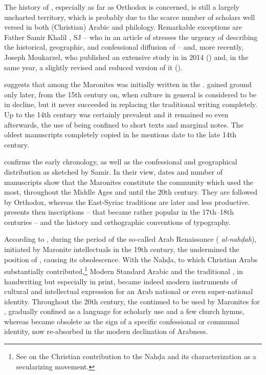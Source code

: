 \documentclass[output=paper,colorlinks,citecolor=brown,arabfont,syriacfont]{langscibook}
\begin{document}
The history of , especially as far as  Orthodox  is concerned, is still a largely uncharted territory, which is probably due to the scarce number of scholars well versed in both (Christian) Arabic and  philology. Remarkable exceptions are Father Samir Khalil \citeauthor{samir1982}, SJ -- who in an article of \citeyear{samir1982} stresses the urgency of describing the historical, geographic, and confessional diffusion of  -- and, more recently, Joseph Moukarzel, who published an extensive study in  in 2014 (\citeyear{moukarzel2014a}) and, in the same year, a slightly revised and reduced  version of it (\citeyear{moukarzel2014b}). 

\citet[43--44]{samir1982} suggests that among the Maronites  was initially written in the  .  gained ground only later, from the 15th century on, when  culture in general is considered to be in decline, but it never succeeded in replacing the traditional  writing completely. Up to the 14th century   was certainly prevalent and it remained so even afterwards, the use of  being confined to short texts and marginal notes. The oldest manuscripts completely copied in  he mentions date to the late 14th century. 


\citet[129--130]{moukarzel2014a} confirms the early chronology, as well as the confessional and geographical distribution as sketched by Samir. In their view, dates and number of manuscripts show that the Maronites constitute the community which used  the most, throughout the Middle Ages and until the 20th century. They are followed by  Orthodox, whereas the East-Syriac  traditions are later and less productive. \citet[130--135]{moukarzel2014a} presents then  inscriptions -- that became rather popular in the 17th--18th centuries -- and the history and orthographic conventions of  typography.


According to \citet{samir1982}, during the period of the so-called Arab Renaissance ( \textit{al-nahḍah}), initiated by Maronite intellectuals in the 19th century, the   undermined the position of , causing its obsolescence. With the Nahḍa, to which Christian Arabs substantially contributed,\footnote{%
See \citet[21]{murre-van_den_berg2020} on the Christian contribution to the Nahḍa and its characterization as a secularizing movement.} Modern Standard Arabic and the traditional  , in handwriting but especially in print, became indeed modern instruments of cultural and intellectual expression for an Arab national or even super-national identity. Throughout the 20th century, the   continued to be used by Maronites for , gradually confined as a language for scholarly use and a few church hymns, whereas  became obsolete as the sign of a specific confessional or communal identity, now re-absorbed in the modern declination of Arabness.
\end{document}
